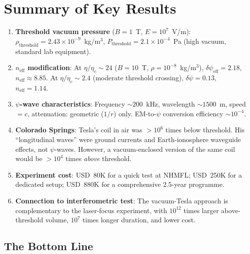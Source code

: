 \documentclass[11pt,a4paper]{article}
\begin{document}
\section{Summary of Key Results}\label{sec:summary}

\begin{tcolorbox}[colback=blue!5!white,colframe=blue!75!black,title=Summary of Computations]
\begin{enumerate}
\item \textbf{Threshold vacuum pressure} ($B = 1$~T, $E = 10^7$~V/m):
  $\rho_{\mathrm{threshold}} = 2.43 \times 10^{-9}$~kg/m$^3$,
  $P_{\mathrm{threshold}} = 2.1 \times 10^{-4}$~Pa (high vacuum, standard lab equipment).

\item \textbf{$n_{\mathrm{eff}}$ modification}: At $\eta/\eta_c \sim 24$
  ($B = 10$~T, $\rho = 10^{-8}$~kg/m$^3$), $\delta\psi_{\mathrm{eff}} = 2.18$,
  $n_{\mathrm{eff}} \approx 8.85$. At $\eta/\eta_c \sim 2.4$ (moderate threshold
  crossing), $\delta\psi = 0.13$, $n_{\mathrm{eff}} = 1.14$.

\item \textbf{$\psi$-wave characteristics}: Frequency $\sim 200$~kHz,
  wavelength $\sim 1500$~m, speed $= c$, attenuation: geometric ($1/r$) only.
  EM-to-$\psi$ conversion efficiency $\sim 10^{-4}$.

\item \textbf{Colorado Springs}: Tesla's coil in air was $>10^6$ times below
  threshold. His ``longitudinal waves'' were ground currents and Earth-ionosphere
  waveguide effects, not $\psi$-waves. However, a vacuum-enclosed version of
  the same coil would be $>10^4$ times \emph{above} threshold.

\item \textbf{Experiment cost}: USD~80K for a quick test at NHMFL; USD~250K for
  a dedicated setup; USD~880K for a comprehensive 2.5-year programme.

\item \textbf{Connection to interferometric test}: The vacuum-Tesla approach is
  complementary to the laser-focus experiment, with $10^{12}$ times larger
  above-threshold volume, $10^7$ times longer duration, and lower cost.
\end{enumerate}
\end{tcolorbox}

\subsection{The Bottom Line}
\end{document}
